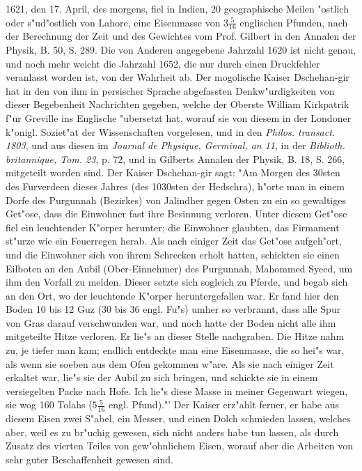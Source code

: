 \documentclass[a4paper, 11pt, oneside, polutonikogreek, german]{article}
\begin{document}
1621, den 17. April, des morgens, fiel in Indien, 20 geographische Meilen "ostlich oder s"ud"ostlich von Lahore, eine Eisenmasse von $\mathfrak{3\frac{5}{16}}$ englischen Pfunden, nach der Berechnung der Zeit und des Gewichtes vom Prof. Gilbert in den Annalen der Physik, B. 50, S. 289. Die von Anderen angegebene Jahrzahl 1620 ist nicht genau, und noch mehr weicht die Jahrzahl 1652, die nur durch einen Druckfehler veranlasst worden ist, von der Wahrheit ab. Der mogolische Kaiser Dschehan-gir hat in den von ihm in persischer Sprache abgefassten Denkw"urdigkeiten von dieser Begebenheit Nachrichten gegeben, welche der Oberste William Kirkpatrik f"ur Greville ins Englische "ubersetzt hat, worauf sie von diesem in der Londoner k"onigl. Soziet"at der Wissenschaften vorgelesen, und in den \emph{Philos. transact. 1803}, und aus diesen im \emph{Journal de Physique, Germinal, an 11}, in der \emph{Biblioth. britannique, Tom. 23}, p. 72, und in Gilberts Annalen der Physik, B. 18, S. 266, mitgeteilt worden sind. Der Kaiser Dschehan-gir sagt: "Am Morgen des 30sten des Furverdeen dieses Jahres (des 1030sten der Hedschra), h"orte man in einem Dorfe des Purgunnah (Bezirkes) von Jalindher gegen Osten zu ein so gewaltiges Get"ose, dass die Einwohner fast ihre Besinnung verloren. Unter diesem Get"ose fiel ein leuchtender K"orper herunter; die Einwohner glaubten, das Firmament st"urze wie ein Feuerregen herab. Als nach einiger Zeit das Get"ose aufgeh"ort, und die Einwohner sich von ihrem Schrecken erholt hatten, schickten sie einen Eilboten an den Aubil (Ober-Einnehmer) des Purgunnah, Mahommed Syeed, um ihm den Vorfall zu melden. Dieser setzte sich sogleich zu Pferde, und begab sich an den Ort, wo der leuchtende K"orper heruntergefallen war. Er fand hier den Boden 10 bis 12 Guz (30 bis 36 engl. Fu"s) umher so verbrannt, dass alle Spur von Gras darauf verschwunden war, und noch hatte der Boden nicht alle ihm mitgeteilte Hitze verloren. Er lie"s an dieser Stelle nachgraben. Die Hitze nahm zu, je tiefer man kam; endlich entdeckte man eine Eisenmasse, die so hei"s war, als wenn sie soeben aus dem Ofen gekommen w"are. Als sie nach einiger Zeit erkaltet war, lie"s sie der Aubil zu sich bringen, und schickte sie in einem versiegelten Packe nach Hofe. Ich lie"s diese Masse in meiner Gegenwart wiegen, sie wog 160 Tolahs ($\mathfrak{5\frac{5}{16}}$ engl. Pfund)."' Der Kaiser erz"ahlt ferner, er habe aus diesem Eisen zwei S"abel, ein Messer, und einen Dolch schmieden lassen, welches aber, weil es zu br"uchig gewesen, sich nicht anders habe tun lassen, als durch Zusatz des vierten Teiles von gew"ohnlichem Eisen, worauf aber die Arbeiten von sehr guter Beschaffenheit gewesen sind.
\end{document}
